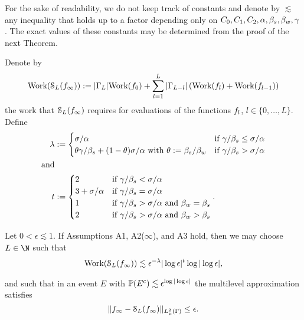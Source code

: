 For the sake of readability, we do not keep track of constants  and denote by $\lesssim$ any inequality that holds up to a factor depending only on $C_0,C_1,C_2,\alpha,\beta_{s},\beta_{w},\gamma$.
The exact values of these constants may be determined from the proof of the next Theorem.
\begin{thm}
	\label{thm:main}	
Denote by 
\begin{equation}
\label{eq:workdef}
\text{Work}(\mathcal{S}_{L}(f_{\infty})):=|\Gamma_L|\text{Work}(f_0)+\sum_{l=1}^{L}|\Gamma_{L-l}|\left(\text{Work}(f_l)+\text{Work}(f_{l-1})\right)
\end{equation}
the work that $\mathcal{S}_{L}(f_{\infty})$ requires for evaluations of the functions $f_{l}$, $l\in\{0,\dots,L\}$.
Define
\begin{align*}
\rate&:=\begin{cases}
\dimp/\alpha& \text{if } \gamma/\sc\leq \dimp/\alpha\\
\theta \gamma/\sc+(1-\theta)\dimp/\alpha \text{ with }\theta:=\sc/\wc& \text{if }\gamma/\sc>\dimp/\alpha
\end{cases}\\
\text{and}\\
\lrate&:=\begin{cases}
2& \text{if } \gamma/\sc<\dimp/\alpha\\
3+\dimp/\alpha&\text{if }\gamma/\sc=\dimp/\alpha\\
1& \text{if }\gamma/\sc>\dimp/\alpha \text{ and }\wc=\sc\\
2&\text{if }\gamma/\sc>\dimp/\alpha \text{ and }\wc>\sc
\end{cases}.%
\end{align*}
	
Let $0<\epsilon\lesssim 1$. If Assumptions A1, A2($\infty$), and A3 hold, then we may choose $L\in\N$ such that 
	\begin{equation*}
	\begin{split}
	\text{Work}(\mathcal{S}_{L}(f_{\infty}))\lesssim \epsilon^{-\lambda}|\log \epsilon|^{t}\log|\log \epsilon|,
	\end{split}
	\end{equation*}

	and such that in an event $E$ with $\mathbb{P}(E^{c})\lesssim \epsilon^{\log|\log \epsilon|}$ the multilevel approximation satisfies
	\begin{equation}
	\|f_{\infty}-\mathcal{S}_{L}(f_{\infty})\|_{L^2_{\mu}(\Gamma)}\leq \epsilon.
	\end{equation}
	
\end{thm}

